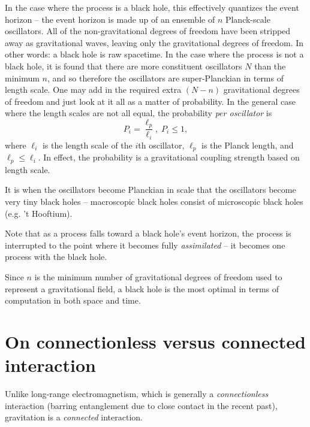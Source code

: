 \documentclass[12pt]{article}
\begin{document}
{In the case where the process is a black hole, this effectively quantizes the event horizon -- the event horizon is made up of an ensemble of $n$ Planck-scale oscillators.
All of the non-gravitational degrees of freedom have been stripped away as gravitational waves, leaving only the gravitational degrees of freedom.
In other words: a black hole is raw spacetime.
In the case where the process is not a black hole, it is found that there are more constituent oscillators $N$ than the minimum $n$, and so therefore the oscillators are super-Planckian in terms of length scale.
One may add in the required extra $(N - n)$ gravitational degrees of freedom and just look at it all as a matter of probability.
In the general case where the length scales are not all equal, the probability {\textit{per oscillator}} is 
\begin{equation}
P_i = \frac{\ell_p}{\ell_i}, \; P_i \leq 1,
\end{equation}
where $\ell_i$ is the length scale of the $i$th oscillator, $\ell_p$ is the Planck length, and $\ell_p \leq \ell_i$.
In effect, the probability is a gravitational coupling strength based on length scale.

It is when the oscillators become Planckian in scale that the oscillators become very tiny black holes \cite{string} -- macroscopic black holes consist of microscopic black holes (e.g. 't Hooftium).

Note that as a process falls toward a black hole's event horizon, the process is interrupted to the point where it becomes fully {\textit{assimilated}} -- it becomes one process with the black hole.

Since $n$ is the minimum number of gravitational degrees of freedom used to represent a gravitational field, a black hole is the most optimal in terms of computation in both space and time.





\section{On connectionless versus connected interaction}

Unlike long-range electromagnetism, which is generally a {\textit{connectionless}} interaction (barring entanglement due to close contact in the recent past), gravitation is a {\textit{connected}} interaction.

}
\end{document}
